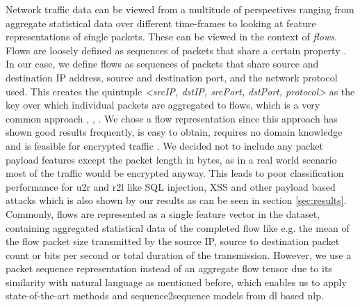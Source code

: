 Network traffic data can be viewed from a multitude of perspectives ranging from aggregate statistical data over different time-frames \cite{kitsune} to looking at feature representations of single packets. These can be viewed in the context of \textit{flows}.
Flows are loosely defined as sequences of packets that share a certain property \cite{adversarial_recurrent_ids}. In our case, we define flows as sequences of packets that share source and destination IP address, source and destination port, and the network protocol used. This creates the quintuple \textit{<srcIP, dstIP, srcPort, dstPort, protocol>} as the key over which individual packets are aggregated to flows, which is a very common approach \cite{caia_vector}, \cite{unsw_nb15}, \cite{feature_vectors}. We chose a flow representation since this approach has shown good results frequently, is easy to obtain, requires no domain knowledge and is feasible for encrypted traffic \cite{feature_vectors}. We decided not to include any packet payload features except the packet length in bytes, as in a real world scenario most of the traffic would be encrypted anyway. This leads to poor classification performance for \gls{u2r} and \gls{r2l} \cite{nsl_kdd} like SQL injection, XSS and other payload based attacks which is also shown by our results as can be seen in section \ref{sec:results}. Commonly, flows are represented as a single feature vector in the dataset, containing aggregated statistical data of the completed flow like e.g. the mean of the flow packet size transmitted by the source IP, source to destination packet count or bits per second or total duration of the transmission. However, we use a packet sequence representation instead of an aggregate flow tensor due to its similarity with natural language as mentioned before, which enables us to apply state-of-the-art methods and sequence2sequence models from \gls{dl} based \gls{nlp}. 


